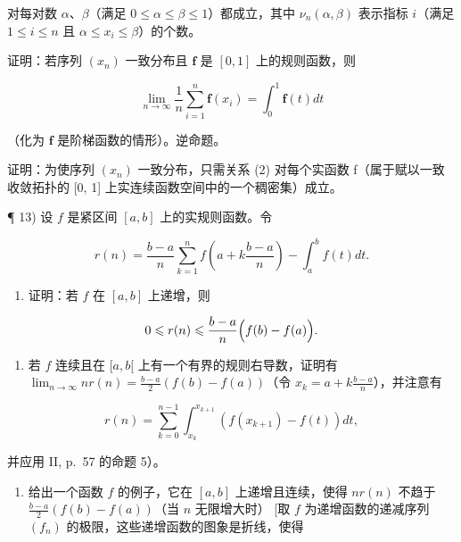 对每对数 \(\alpha\)、\(\beta\)（满足 \(0 \leqslant \alpha \leqslant \beta \leqslant 1\)）都成立，其中 \(\nu_{n}(\alpha, \beta)\) 表示指标 \(i\)（满足 \(1 \leqslant i \leqslant n\) 且 \(\alpha \leqslant x_{i} \leqslant \beta\)）的个数。

证明：若序列 \((x_{n})\) 一致分布且 \(\mathbf{f}\) 是 \([0, 1]\) 上的规则函数，则

\[
\lim _ {n \rightarrow \infty} \frac {1}{n} \sum_ {i = 1} ^ {n} \mathbf {f} (x _ {i}) = \int_ {0} ^ {1} \mathbf {f} (t) d t\tag{2}
\]

（化为 \(\mathbf{f}\) 是阶梯函数的情形）。逆命题。

证明：为使序列 \((x_{n})\) 一致分布，只需关系 (2) 对每个实函数 f（属于赋以一致收敛拓扑的 {[}0, 1{]} 上实连续函数空间中的一个稠密集）成立。

¶ 13) 设 \(f\) 是紧区间 \([a, b]\) 上的实规则函数。令

\[
r (n) = \frac {b - a}{n} \sum_ {k = 1} ^ {n} f \left(a + k \frac {b - a}{n}\right) - \int_ {a} ^ {b} f (t) d t.
\]

\begin{enumerate}
\def\labelenumi{\alph{enumi})}
\tightlist
\item
  证明：若 \(f\) 在 \([a, b]\) 上递增，则
\end{enumerate}

\[
0 \leqslant r (n) \leqslant \frac {b - a}{n} \Bigl (f (b) - f (a) \Bigr).
\]

\begin{enumerate}
\def\labelenumi{\alph{enumi})}
\setcounter{enumi}{1}
\tightlist
\item
  若 \(f\) 连续且在 \([a, b[\) 上有一个有界的规则右导数，证明有 \(\lim_{n\to \infty}nr(n) = \frac{b - a}{2} (f(b) - f(a))\)（令 \(x_{k} = a + k\frac{b - a}{n}\)），并注意有
\end{enumerate}

\[
r (n) = \sum_ {k = 0} ^ {n - 1} \int_ {x _ {k}} ^ {x _ {k + 1}} \left(f (x _ {k + 1}) - f (t)\right) d t,
\]

并应用 II, p.~57 的命题 5）。

\begin{enumerate}
\def\labelenumi{\alph{enumi})}
\setcounter{enumi}{2}
\tightlist
\item
  给出一个函数 \(f\) 的例子，它在 \([a, b]\) 上递增且连续，使得 \(nr(n)\) 不趋于 \(\frac{b - a}{2} (f(b) - f(a))\)（当 \(n\) 无限增大时） {[}取 \(f\) 为递增函数的递减序列 \((f_n)\) 的极限，这些递增函数的图象是折线，使得
\end{enumerate}

